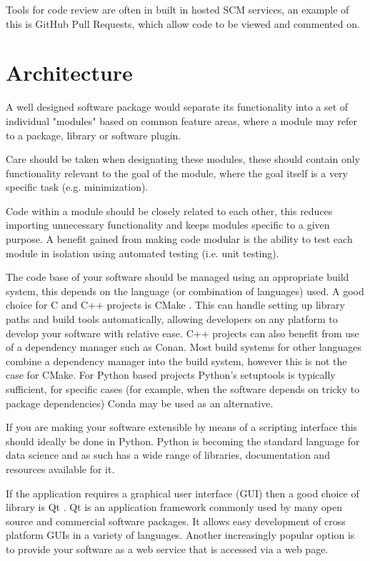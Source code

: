 \documentclass[jnr]{iosart2x}
\begin{document}
Tools for code review are often in built in hosted SCM services, an example of this is GitHub Pull Requests, which allow code to be viewed and commented on.

\section{Architecture}
\label{Architecture}

A well designed software package would separate its functionality into a set of individual "modules" based on common feature areas, where a module may refer to a package, library or software plugin.

Care should be taken when designating these modules, these should contain only functionality relevant to the goal of the module, where the goal itself is a very specific task (e.g. minimization).

Code within a module should be closely related to each other, this reduces importing unnecessary functionality and keeps modules specific to a given purpose.
A benefit gained from making code modular is the ability to test each module in isolation using automated testing (i.e. unit testing).

The code base of your software should be managed using an appropriate build system, this depends on the language (or combination of languages) used.
A good choice for C and C++ projects is CMake \cite{CMake}.
This can handle setting up library paths and build tools automatically, allowing developers on any platform to develop your software with relative ease.
C++ projects can also benefit from use of a dependency manager such as Conan.
Most build systems for other languages combine a dependency manager into the build system, however this is not the case for CMake.
For Python based projects Python's setuptools is typically sufficient, for specific cases (for example, when the software depends on tricky to package dependencies) Conda may be used as an alternative.

If you are making your software extensible by means of a scripting interface this should ideally be done in Python.
Python is becoming the standard language for data science and as such has a wide range of libraries, documentation and resources available for it.

If the application requires a graphical user interface (GUI) then a good choice of library is Qt \cite{Qt}.
Qt is an application framework commonly used by many open source and commercial software packages.
It allows easy development of cross platform GUIs in a variety of languages.
Another increasingly popular option is to provide your software as a web service that is accessed via a web page.
\end{document}

